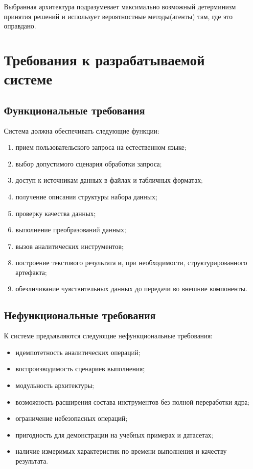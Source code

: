 \documentclass[14pt,a4paper]{extarticle}
\begin{document}
Выбранная архитектура подразумевает максимально возможный детерминизм принятия решений и использует вероятностные методы(агенты) там, где это оправдано.

\section{Требования к разрабатываемой системе}

\subsection{Функциональные требования}

Система должна обеспечивать следующие функции:
\begin{enumerate}
    \item прием пользовательского запроса на естественном языке;
    \item выбор допустимого сценария обработки запроса;
    \item доступ к источникам данных в файлах и табличных форматах;
    \item получение описания структуры набора данных;
    \item проверку качества данных;
    \item выполнение преобразований данных;
    \item вызов аналитических инструментов;
    \item построение текстового результата и, при необходимости, структурированного артефакта;
    \item обезличивание чувствительных данных до передачи во внешние компоненты.
\end{enumerate}

\subsection{Нефункциональные требования}

К системе предъявляются следующие нефункциональные требования:
\begin{itemize}
    \item идемпотетность аналитических операций;
    \item воспроизводимость сценариев выполнения;
    \item модульность архитектуры;
    \item возможность расширения состава инструментов без полной переработки ядра;
    \item ограничение небезопасных операций;
    \item пригодность для демонстрации на учебных примерах и датасетах;
    \item наличие измеримых характеристик по времени выполнения и качеству результата.
\end{itemize}
\end{document}
